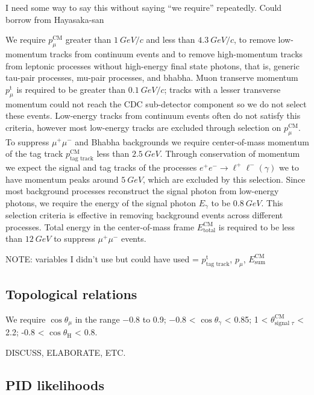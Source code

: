 \documentclass[12pt]{thesis}  %
\begin{document}
{\large I need some way to say this without saying ``we require'' repeatedly. Could borrow from Hayasaka-san}

We require $p^{\text{CM}}_{\mu}$ greater than $\SI{1}{GeV/c}$ and less than $\SI{4.3}{GeV/c}$, to remove low-momentum tracks from continuum events and to remove high-momentum tracks from leptonic processes without high-energy final state photons, that is, generic tau-pair processes, mu-pair processes, and bhabha. Muon transerve momentum $p^{\text{t}}_{\mu}$ is required to be greater than $\SI{0.1}{GeV/c}$; tracks with a lesser transverse momentum could not reach the CDC sub-detector component so we do not select these events. Low-energy tracks from continuum events often do not satisfy this criteria, however most low-energy tracks are excluded through selection on $p^{\text{CM}}_{\mu}$. To suppress $\mu^+\mu^-$ and Bhabha backgrounds we require center-of-mass momentum of the tag track $p^{\text{CM}}_{\text{tag track}}$ less than $\SI{2.5}{GeV}$. Through conservation of momentum we expect the signal and tag tracks of the processes $e^+ e^-\to\ell^+ \ell^- (\gamma)$ we to have momentum peaks around $\SI{5}{GeV}$, which are excluded by this selection. Since most background processes reconstruct the signal photon from low-energy photons, we require the energy of the signal photon $E_{\gamma}$ to be $\SI{0.8}{GeV}$. This selection criteria is effective in removing background events across different processes. Total energy in the center-of-mass frame $E^{\text{CM}}_{\text{total}}$ is required to be less than $\SI{12}{GeV}$ to suppress $\mu^+\mu^-$ events.

NOTE: variables I didn't use but could have used = $p^{\text{t}}_{\text{tag track}}$, $p_{\mu}$, $E^{\text{CM}}_{\text{sum}}$


\subsection{Topological relations}

We require $\cos\theta_{\mu}$ in the range \num{-0.8} to \num{0.9}; \num{-0.8} < $\cos\theta_{\gamma}$ < \num{0.85}; \num{1} < $\theta^{\text{CM}}_{\text{signal $\tau$}}$ < \num{2.2}; -0.8 < $\cos\theta_{\text{H}}$ < 0.8.

DISCUSS, ELABORATE, ETC.

\subsection{PID likelihoods}
\end{document}
